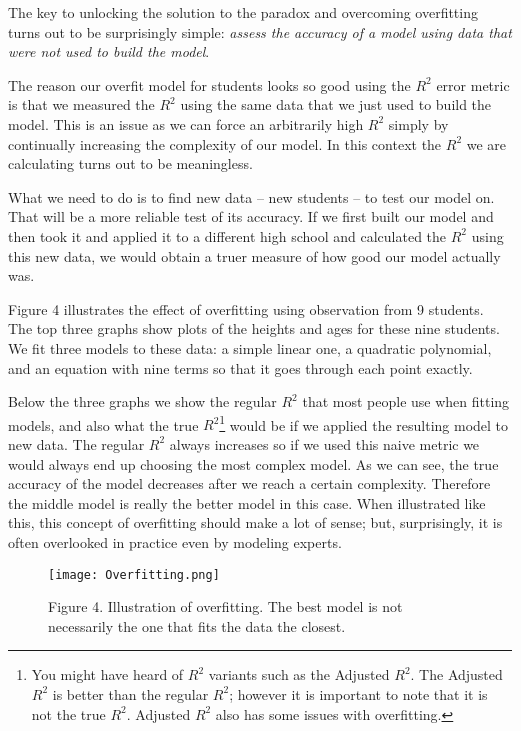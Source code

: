 \documentclass[]{memoir}
\let\Oldincludegraphics\includegraphics
\renewcommand{\includegraphics}[1]{\Oldincludegraphics[max size={\textwidth}{\textheight}]{#1}}
\begin{document}
The key to unlocking the solution to the paradox and overcoming
overfitting turns out to be surprisingly simple: \emph{assess the
accuracy of a model using data that were not used to build the model}.

The reason our overfit model for students looks so good using the $R^2$
error metric is that we measured the $R^2$ using the same data that we
just used to build the model. This is an issue as we can force an
arbitrarily high $R^2$ simply by continually increasing the complexity
of our model. In this context the $R^2$ we are calculating turns out to
be meaningless.

What we need to do is to find new data -- new students -- to test our
model on. That will be a more reliable test of its accuracy. If we first
built our model and then took it and applied it to a different high
school and calculated the $R^2$ using this new data, we would obtain a
truer measure of how good our model actually was.

Figure 4 illustrates the effect of overfitting using observation from 9
students. The top three graphs show plots of the heights and ages for
these nine students. We fit three models to these data: a simple linear
one, a quadratic polynomial, and an equation with nine terms so that it
goes through each point exactly.

Below the three graphs we show the regular $R^2$ that most people use
when fitting models, and also what the true $R^2$\footnote{You might
  have heard of $R^2$ variants such as the Adjusted $R^2$. The Adjusted
  $R^2$ is better than the regular $R^2$; however it is important to
  note that it is not the true $R^2$. Adjusted $R^2$ also has some
  issues with overfitting.} would be if we applied the resulting model
to new data. The regular $R^2$ always increases so if we used this naive
metric we would always end up choosing the most complex model. As we can
see, the true accuracy of the model decreases after we reach a certain
complexity. Therefore the middle model is really the better model in
this case. When illustrated like this, this concept of overfitting
should make a lot of sense; but, surprisingly, it is often overlooked in
practice even by modeling experts.

\begin{figure}[htbp]
\centering
\texttt{[image: Overfitting.png]}
\caption{Figure 4. Illustration of overfitting. The best model is not
necessarily the one that fits the data the closest.}
\end{figure}
\end{document}
